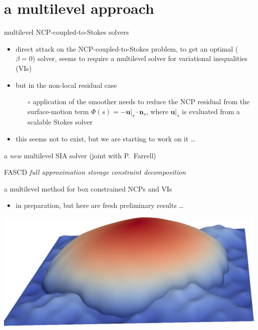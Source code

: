 \documentclass[svgnames,
               hyperref={colorlinks,citecolor=DeepPink4,linkcolor=FireBrick,urlcolor=Maroon},
               usepdftitle=false]  %
               {beamer}
\newcommand{\bn}{\mathbf{n}}
\newcommand{\bu}{\mathbf{u}}
\begin{document}
\section{a multilevel approach}

\begin{frame}{multilevel NCP-coupled-to-Stokes solvers}

\begin{itemize}
\item direct attack on the NCP-coupled-to-Stokes problem, to get an optimal ($\beta=0$) solver, seems to require a \alert{multilevel} solver for \alert{variational inequalities} (VIs)
\item but in the \alert{non-local residual} case
    \begin{itemize}
    \item[$\circ$] application of the smoother needs to reduce the NCP residual from the surface-motion term $\Phi(s) = - \bu|_s\cdot \bn_s$, where $\bu|_s$ is evaluated from a scalable Stokes solver
    \end{itemize}
\item this seems not to exist, but we are starting to work on it \dots
\end{itemize}
\end{frame}


\begin{frame}{a \emph{new} multilevel SIA solver (joint with P.~Farrell)}

\begin{block}{FASCD}
\emph{full approximation storage constraint decomposition}

a multilevel method for box constrained NCPs and VIs
\end{block}

\begin{itemize}
\item in preparation, but here are fresh preliminary results \dots
\end{itemize}

\medskip
\begin{center}
\includegraphics[height=0.55\textheight]{../images/siabumps.png}
\end{center}
\end{frame}
\end{document}
